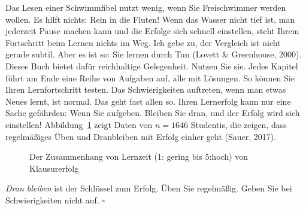 \documentclass[
  letterpaper,
  oneside,
  open=any]{scrbook}
\theoremstyle{definition}
\theoremstyle{definition}
\theoremstyle{definition}
\theoremstyle{remark}
\begin{document}
Das Lesen einer Schwimmfibel nutzt wenig, wenn Sie Freischwimmer werden
wollen. Es hilft nichts: Rein in die Fluten! Wenn das Wasser nicht tief
ist, man jederzeit Pause machen kann und die Erfolge sich schnell
einstellen, steht Ihrem Fortschritt beim Lernen nichts im Weg. Ich gebe
zu, der Vergleich ist nicht gerade subtil. Aber es ist so: Sie lernen
durch Tun (Lovett \& Greenhouse, 2000). Dieses Buch bietet dafür
reichhaltige Gelegenheit. Nutzen Sie sie. Jedes Kapitel führt am Ende
eine Reihe von Aufgaben auf, alle mit Lösungen. So können Sie Ihren
Lernfortschritt testen. Das Schwierigkeiten auftreten, wenn man etwas
Neues lernt, ist normal. Das geht fast allen so. Ihren Lernerfolg kann
nur eine Sache gefährden: Wenn Sie aufgeben. Bleiben Sie dran, und der
Erfolg wird sich einstellen! Abbildung~\ref{fig-lernen} zeigt Daten von
\(n=1646\) Studentis, die zeigen, dass regelmäßiges Üben und Dranbleiben
mit Erfolg einher geht (Sauer, 2017).

\begin{figure}


\caption{\label{fig-lernen}Der Zusammenhang von Lernzeit (1: gering bis
5:hoch) von Klausurerfolg}

\end{figure}%

\begin{tcolorbox}[enhanced jigsaw, bottomrule=.15mm, left=2mm, colbacktitle=quarto-callout-important-color!10!white, bottomtitle=1mm, colframe=quarto-callout-important-color-frame, coltitle=black, rightrule=.15mm, breakable, toptitle=1mm, titlerule=0mm, title=\textcolor{quarto-callout-important-color}{\faExclamation}\hspace{0.5em}{Wichtig}, opacitybacktitle=0.6, arc=.35mm, colback=white, leftrule=.75mm, opacityback=0, toprule=.15mm]

\emph{Dran bleiben} ist der Schlüssel zum Erfolg. Üben Sie regelmäßig.
Geben Sie bei Schwierigkeiten nicht auf. 
  
\(\square\)

\end{tcolorbox}
\end{document}
